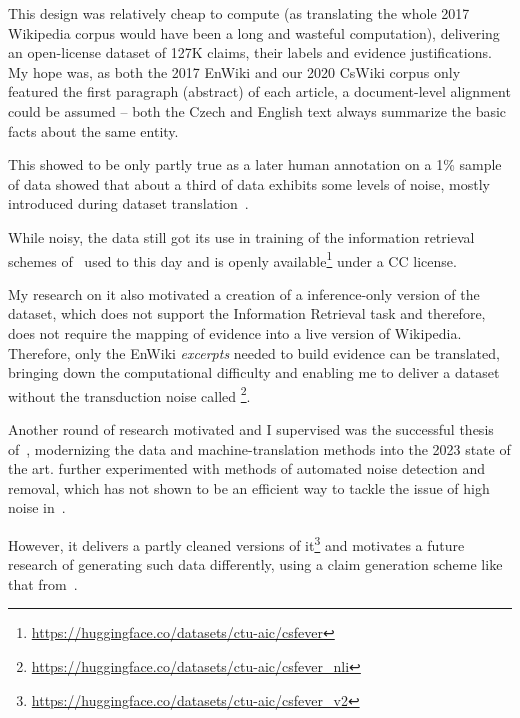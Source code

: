 This design was relatively cheap to compute (as translating the whole 2017 Wikipedia corpus would have been a long and wasteful computation), delivering an open-license dataset of 127K claims, their labels and evidence justifications. My hope was, as both the 2017 EnWiki and our 2020 CsWiki corpus only featured the first paragraph (abstract) of each article, a document-level alignment could be assumed -- both the Czech and English text always summarize the basic facts about the same entity.

This showed to be only partly true as a later human annotation on a 1\% sample of \FCZ data showed that about a third of data exhibits some levels of noise, mostly introduced during dataset translation~\cite{lrev}.

While noisy, the \FCZ data still got its use in training of the information retrieval schemes of~\cite{rypar,gazo,lrev} used to this day and is openly available\footnote{\url{https://huggingface.co/datasets/ctu-aic/csfever}} under a CC license.

My research on it also motivated a creation of a inference-only version of the dataset, which does not support the Information Retrieval task and therefore, does not require the mapping of evidence into a live version of Wikipedia.
Therefore, only the EnWiki \textit{excerpts} needed to build evidence can be translated, bringing down the computational difficulty and enabling me to deliver a dataset without the transduction noise called \FCZNLI\footnote{\url{https://huggingface.co/datasets/ctu-aic/csfever_nli}}. 

Another round of research \FCZ motivated and I supervised was the successful thesis of~\cite{mlynar}, modernizing the data and machine-translation methods into the 2023 state of the art.
\cite{mlynar} further experimented with methods of automated noise detection and removal, which has not shown to be an efficient way to tackle the issue of high noise in \FCZ.

However, it delivers a partly cleaned versions of it\footnote{\url{https://huggingface.co/datasets/ctu-aic/csfever_v2}} and motivates a future research of generating such data differently, using a claim generation scheme like that from~\cite{pan2021zeroshot}.


